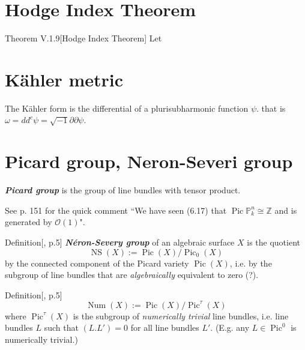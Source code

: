 \section{Hodge Index Theorem}

\begin{thing4}{Theorem V.1.9}[Hodge Index Theorem]\label{prop:V.1.9}\leavevmode
Let
\end{thing4}


\section{Kähler metric}
The Kähler form is the differential of a plurisubharmonic function \(\psi\). that is \(\omega=d d^c \psi=\sqrt{-1} \partial \partial \psi\).

\section{Picard group, Neron-Severi group}

\begin{defn}[dani]\leavevmode
\textit{\textbf{Picard group}} is the group of line bundles with tensor product.
\end{defn}

\begin{remark}\leavevmode
See \cite{hart} p. 151 for the quick comment ``We have seen (6.17) that \(\operatorname{Pic}\mathbb{P}^n_k \cong\mathbb{Z}\) and is generated by \(\mathcal{O}(1)\)".
\end{remark}

\begin{thing4}{Definition}[\cite{huk}, p.5]\leavevmode
\textit{\textbf{Néron-Severy group}} of an algebraic surface \(X\) is the quotient
\[\operatorname{NS}(X):=\operatorname{Pic}(X) /\operatorname{Pic}_0(X)\]
by the connected component of the Picard variety \(\operatorname{Pic}(X)\), i.e. by the subgroup of line bundles that are \textit{algebraically} equivalent to zero (?).
\end{thing4}

\begin{thing4}{Definition}[\cite{huk}, p.5]\label{prop:}\leavevmode
\[\operatorname{Num}(X):=\operatorname{Pic}(X)/\operatorname{Pic}^\tau(X)\]
where \(\operatorname{Pic}^\tau(X)\) is the subgroup of \textit{numerically trivial} line bundles, i.e. line bundles \(L\) such that \((L.L')=0\) for all line bundles \(L'\). (E.g. any  \(L \in \operatorname{Pic}^0\) is numerically trivial.) 
\end{thing4}

